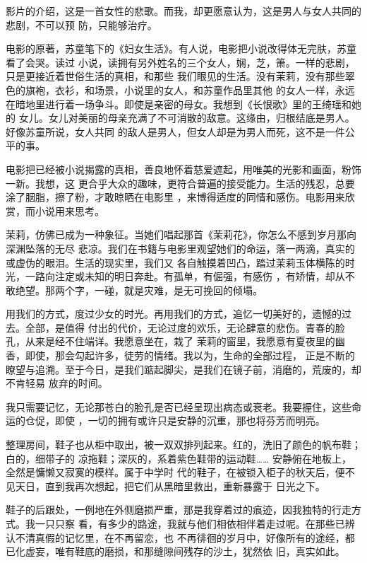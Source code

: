 \documentclass[12pt,a4paper]{article}
\begin{document}
		影片的介绍，这是一首女性的悲歌。而我，却更愿意认为，这是男人与女人共同的悲剧，不可以预
	防，只能够治疗。

		电影的原著，苏童笔下的《妇女生活》。有人说，电影把小说改得体无完肤，苏童看了会哭。读过
	小说，读拥有另外姓名的三个女人，娴，芝，箫。一样的悲剧，只是更接近着世俗生活的真相，和那些
	我们眼见的生活。没有茉莉，没有那些翠色的旗袍，衣衫，和场景，小说里的女人，和苏童作品里其他
	的女人一样，永远在暗地里进行着一场争斗。即使是亲密的母女。我想到《长恨歌》里的王绮瑶和她的
	女儿。女儿对美丽的母亲充满了不可消散的敌意。这缘由，归根结底是男人。好像苏童所说，女人共同
	的敌人是男人，但女人却是为男人而死，这不是一件公平的事。

		电影把已经被小说揭露的真相，善良地怀着慈爱遮起，用唯美的光影和画面，粉饰一新。我想，这
	更合乎大众的趣味，更符合普遍的接受能力。生活的残忍，总要涂了胭脂，擦了粉，才敢晾晒在电影里
	，来博得适度的同情和感伤。电影用来欣赏，而小说用来思考。

		茉莉，仿佛已成为一种象征。当她们唱起那首《茉莉花》，你怎么不感到岁月那向深渊坠落的无尽
	悲凉。我们在书籍与电影里观望她们的命运，落一两滴，真实的或虚伪的眼泪。生活的现实里，我们又
	各自触摸着凹凸，踏过茉莉玉体横陈的时光，一路向注定或未知的明日奔赴。有孤单，有倔强，有感伤
	，有矫情，却从不敢绝望。那两个字，一碰，就是灾难，是无可挽回的倾塌。


		用我们的方式，度过少女的时光。再用我们的方式，追忆一切美好的，遗憾的过去。全部，是值得
	付出的代价，无论过度的欢乐，无论肆意的悲伤。青春的脸孔，从来是经不住端详。我愿意坐在，栽了
	茉莉的窗里，我愿意有夏夜里的幽香，即使，那会勾起许多，徒劳的情绪。我以为，生命的全部过程，
	正是不断的瞭望与追溯。至于今日，是我们踮起脚尖，是我们在镜子前，消磨的，荒废的，却不肯轻易
	放弃的时间。

		我只需要记忆，无论那苍白的脸孔是否已经呈现出病态或衰老。我要握住，这些命运的仓促，即使
	，一切的拥有或许只是安静的沉重，那也将芬芳而明亮。

	\endwriting



		整理房间，鞋子也从柜中取出，被一双双排列起来。红的，洗旧了颜色的帆布鞋；白的，细带子的
	凉拖鞋；深灰的，系着紫色鞋带的运动鞋…… 安静俯在地板上，全然是慵懒又寂寞的模样。属于中学时
	代的鞋子，在被锁入柜子的秋天后，便不见天日，直到我再次想起，把它们从黑暗里救出，重新暴露于
	日光之下。


		鞋子的后跟处，一例地在外侧磨损严重，那是我穿着过的痕迹，因我独特的行走方式。我一只只察
	看，有多少的路途，我就与他们相依相伴着走过呢。在那些已辨认不清真假的记忆里，在不再留恋，也
	不再徘徊的岁月中，好像所有的途经，都已化虚妄，唯有鞋底的磨损，和那缝隙间残存的沙土，犹然依
	旧，真实如此。
\end{document}
